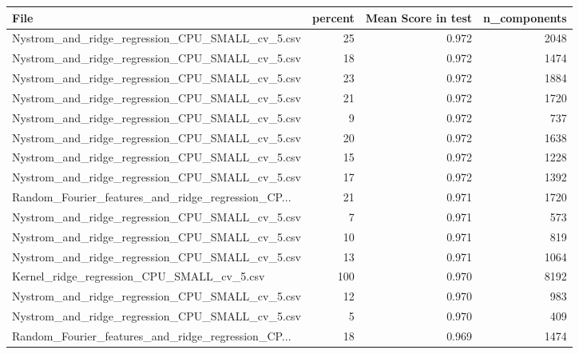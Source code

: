 \begin{tabularx}{\textwidth}{lrrr}
\toprule
                                              File &  percent &  Mean Score in test &  n\_components \\
\midrule
   Nystrom\_and\_ridge\_regression\_CPU\_SMALL\_cv\_5.csv &       25 &               0.972 &          2048 \\
   Nystrom\_and\_ridge\_regression\_CPU\_SMALL\_cv\_5.csv &       18 &               0.972 &          1474 \\
   Nystrom\_and\_ridge\_regression\_CPU\_SMALL\_cv\_5.csv &       23 &               0.972 &          1884 \\
   Nystrom\_and\_ridge\_regression\_CPU\_SMALL\_cv\_5.csv &       21 &               0.972 &          1720 \\
   Nystrom\_and\_ridge\_regression\_CPU\_SMALL\_cv\_5.csv &        9 &               0.972 &           737 \\
   Nystrom\_and\_ridge\_regression\_CPU\_SMALL\_cv\_5.csv &       20 &               0.972 &          1638 \\
   Nystrom\_and\_ridge\_regression\_CPU\_SMALL\_cv\_5.csv &       15 &               0.972 &          1228 \\
   Nystrom\_and\_ridge\_regression\_CPU\_SMALL\_cv\_5.csv &       17 &               0.972 &          1392 \\
Random\_Fourier\_features\_and\_ridge\_regression\_CP... &       21 &               0.971 &          1720 \\
   Nystrom\_and\_ridge\_regression\_CPU\_SMALL\_cv\_5.csv &        7 &               0.971 &           573 \\
   Nystrom\_and\_ridge\_regression\_CPU\_SMALL\_cv\_5.csv &       10 &               0.971 &           819 \\
   Nystrom\_and\_ridge\_regression\_CPU\_SMALL\_cv\_5.csv &       13 &               0.971 &          1064 \\
        Kernel\_ridge\_regression\_CPU\_SMALL\_cv\_5.csv &      100 &               0.970 &          8192 \\
   Nystrom\_and\_ridge\_regression\_CPU\_SMALL\_cv\_5.csv &       12 &               0.970 &           983 \\
   Nystrom\_and\_ridge\_regression\_CPU\_SMALL\_cv\_5.csv &        5 &               0.970 &           409 \\
Random\_Fourier\_features\_and\_ridge\_regression\_CP... &       18 &               0.969 &          1474 \\

\end{tabularx}
